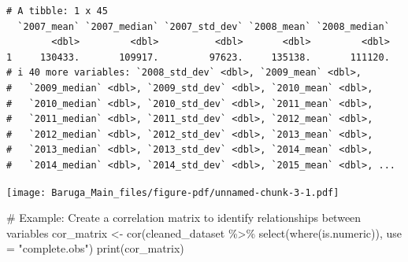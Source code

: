 \documentclass[
  letterpaper,
  DIV=11,
  numbers=noendperiod]{scrreprt}
\newenvironment{Shaded}{\begin{snugshade}}{\end{snugshade}}
\newcommand{\AttributeTok}[1]{\textcolor[rgb]{0.40,0.45,0.13}{#1}}
\newcommand{\CommentTok}[1]{\textcolor[rgb]{0.37,0.37,0.37}{#1}}
\newcommand{\DecValTok}[1]{\textcolor[rgb]{0.68,0.00,0.00}{#1}}
\newcommand{\FunctionTok}[1]{\textcolor[rgb]{0.28,0.35,0.67}{#1}}
\newcommand{\NormalTok}[1]{\textcolor[rgb]{0.00,0.23,0.31}{#1}}
\newcommand{\OtherTok}[1]{\textcolor[rgb]{0.00,0.23,0.31}{#1}}
\newcommand{\SpecialCharTok}[1]{\textcolor[rgb]{0.37,0.37,0.37}{#1}}
\newcommand{\StringTok}[1]{\textcolor[rgb]{0.13,0.47,0.30}{#1}}
\begin{document}
\begin{verbatim}
# A tibble: 1 x 45
  `2007_mean` `2007_median` `2007_std_dev` `2008_mean` `2008_median`
        <dbl>         <dbl>          <dbl>       <dbl>         <dbl>
1     130433.       109917.         97623.     135138.       111120.
# i 40 more variables: `2008_std_dev` <dbl>, `2009_mean` <dbl>,
#   `2009_median` <dbl>, `2009_std_dev` <dbl>, `2010_mean` <dbl>,
#   `2010_median` <dbl>, `2010_std_dev` <dbl>, `2011_mean` <dbl>,
#   `2011_median` <dbl>, `2011_std_dev` <dbl>, `2012_mean` <dbl>,
#   `2012_median` <dbl>, `2012_std_dev` <dbl>, `2013_mean` <dbl>,
#   `2013_median` <dbl>, `2013_std_dev` <dbl>, `2014_mean` <dbl>,
#   `2014_median` <dbl>, `2014_std_dev` <dbl>, `2015_mean` <dbl>, ...
\end{verbatim}

\begin{Shaded}
\end{Shaded}

\texttt{[image: Baruga\_Main\_files/figure-pdf/unnamed-chunk-3-1.pdf]}

\begin{Shaded}
\begin{Highlighting}[]
\CommentTok{\# Example: Create a correlation matrix to identify relationships between variables}
\NormalTok{cor\_matrix }\OtherTok{\textless{}{-}} \FunctionTok{cor}\NormalTok{(cleaned\_dataset }\SpecialCharTok{\%\textgreater{}\%} \FunctionTok{select}\NormalTok{(}\FunctionTok{where}\NormalTok{(is.numeric)), }\AttributeTok{use =} \StringTok{"complete.obs"}\NormalTok{)}
\FunctionTok{print}\NormalTok{(cor\_matrix)}
\end{Highlighting}
\end{Shaded}
\end{document}
